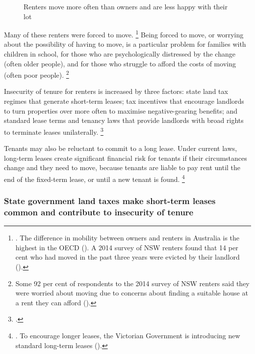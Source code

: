 \begin{figure}
\caption{Renters move more often than owners and are less happy with their lot}\label{fig:renter-satisfaction-moves}
\end{figure}

Many of these renters were forced to move.%
	\footnote{\textcites{ABS-201314-occupancy-and-costs}{KellyHarrisonHunterEtAl2013}{Ellis-2017-Speech-Aust-Housing-Researchers}.
	The difference in mobility between owners and renters in Australia is the highest in the OECD (\textcite{KellyWeidmannWalsh2011}).
	A 2014 survey of NSW renters found that 14 per cent who had moved in the past three years were evicted by their landlord (\textcite{NSW-Tenants-Union-2014-Survey-report}).}
Being forced to move, or worrying about the possibility of having to move, is a particular problem for families with children in school, for those who are psychologically distressed by the change (often older people), and for those who struggle to afford the costs of moving (often poor people).%
	\footnote{Some 92 per cent of respondents to the 2014 survey of NSW renters said they were worried about moving due to concerns about finding a suitable house at a rent they can afford (\textcite{NSW-Tenants-Union-2014-Survey-report}).}

Insecurity of tenure for renters is increased by three factors: state land tax regimes that generate short-term leases; tax incentives that encourage landlords to turn properties over more often to maximise negative-gearing benefits; and standard lease terms and tenancy laws that provide landlords with broad rights to terminate leases unilaterally.%
	\footcite[][26]{DaleyWood2016-Negative-Gearing-CGT}
	
Tenants may also be reluctant to commit to a long lease.
Under current laws, long-term leases create significant financial risk for tenants if their circumstances change and they need to move, because tenants are liable to pay rent until the end of the fixed-term lease, or until a new tenant is found.%
	\footnote{\textcite{James-2015-Should-Aust-adopt-10yr-leases}. To encourage longer leases, the Victorian Government is introducing new standard long-term leases (\textcite{VicStateGov2017Homes}).}

\subsubsection{State government land taxes make short-term leases common and contribute to insecurity of tenure }\label{subsec:state-government-land-taxes-make-short-term-leases-common-and-contribute-to-insecurity-of-tenure}

